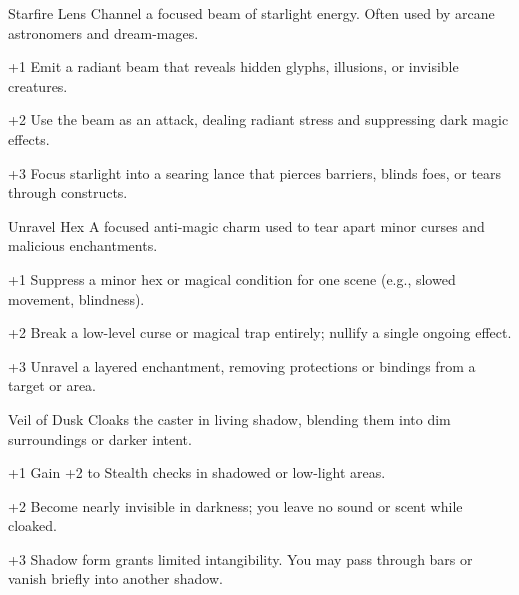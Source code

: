 \begin{WyrdSpell}[Astral]{Starfire Lens}
    Channel a focused beam of starlight energy. Often used by arcane astronomers and dream-mages.

    \begin{WyrdSpellBlock}
        \item[+1] Emit a radiant beam that reveals hidden glyphs, illusions, or invisible creatures.
        \item[+2] Use the beam as an attack, dealing radiant stress and suppressing dark magic effects.
        \item[+3] Focus starlight into a searing lance that pierces barriers, blinds foes, or tears through constructs.
    \end{WyrdSpellBlock}
\end{WyrdSpell}


\begin{WyrdSpell}[Abjuration]{Unravel Hex}
    A focused anti-magic charm used to tear apart minor curses and malicious enchantments.

    \begin{WyrdSpellBlock}
        \item[+1] Suppress a minor hex or magical condition for one scene (e.g., slowed movement, blindness).
        \item[+2] Break a low-level curse or magical trap entirely; nullify a single ongoing effect.
        \item[+3] Unravel a layered enchantment, removing protections or bindings from a target or area.
    \end{WyrdSpellBlock}
\end{WyrdSpell}

\begin{WyrdSpell}[Illusion]{Veil of Dusk}
    Cloaks the caster in living shadow, blending them into dim surroundings or darker intent.

    \begin{WyrdSpellBlock}
        \item[+1] Gain +2 to Stealth checks in shadowed or low-light areas.
        \item[+2] Become nearly invisible in darkness; you leave no sound or scent while cloaked.
        \item[+3] Shadow form grants limited intangibility. You may pass through bars or vanish briefly into another shadow.
    \end{WyrdSpellBlock}
\end{WyrdSpell}

